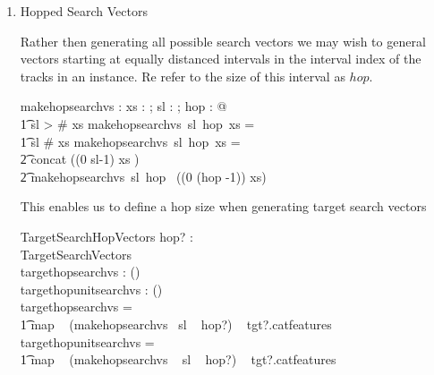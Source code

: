 \documentclass[11pt]{article}
\begin{document}
\begin{enumerate}
\begin{schema}{TargetSearchVectors}
	IdentifySourceTarget \\
	IdentifySequence\\
	targetsearchvs :  \seq (\seq \Vdsl) \\  
	targetunitsearchvs :  \seq (\seq \Vsl) \\  
\where
	targetsearchvs =  \\
	\t1 map ~ (makesearchvs ~ sl) ~ tgt?.catfeatures  \\
	targetunitsearchvs =  \\
	\t1 map ~ (makesearchvs ~ sl) ~ tgt?.catfeatures  \\
\end{schema}

\item \textsf{Hopped Search Vectors}

Rather then generating all possible search vectors we may wish to general vectors starting at equally distanced intervals in the interval index of the tracks in an instance.  Re refer to the size of this interval as $hop$. 


\begin{axdef}
 	makehopsearchvs : \nat \fun  \nat \fun \seq \Vd \fun \seq \Vdsl
\where 
	\forall xs :  \seq \FV ; sl : \nat  ; hop  : \nat  @ \\
\t1 sl > \# xs \implies makehopsearchvs~sl~hop~xs = \langle \rangle  \land \\
\t1 sl \leq \# xs \implies makehopsearchvs~sl~hop~xs = \\
\t2 concat (\langle (0 \upto sl-1) \dres xs  \rangle)  \cat  \\
\t2 			makehopsearchvs~sl~hop~ ((0 \upto (hop -1)) \ndres xs)
\end{axdef}

This enables us to define a hop size when generating target search vectors

\begin{schema}{TargetSearchHopVectors}
	hop? : \nat \\
	TargetSearchVectors \\
	targethopsearchvs :  \seq (\seq \Vdsl) \\  
	targethopunitsearchvs :  \seq (\seq \Vsl) \\  
\where
	targethopsearchvs =  \\
	\t1 map ~ (makehopsearchvs ~sl ~ hop?) ~ tgt?.catfeatures  \\
	targethopunitsearchvs =  \\
	\t1 map ~ (makehopsearchvs ~ sl ~ hop?) ~ tgt?.catfeatures  \\
\end{schema}

\end{enumerate}
\end{document}
